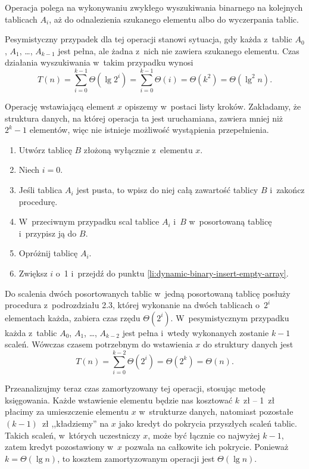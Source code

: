 
\subproblem %
Operacja  polega na wykonywaniu zwykłego wyszukiwania binarnego na kolejnych tablicach $A_i$, aż do odnalezienia szukanego elementu albo do wyczerpania tablic.

Pesymistyczny przypadek dla tej operacji stanowi sytuacja, gdy każda z~tablic $A_0$, $A_1$, \dots, $A_{k-1}$ jest pełna, ale żadna z~nich nie zawiera szukanego elementu.
Czas działania wyszukiwania w~takim przypadku wynosi
\[
	T(n) = \sum_{i=0}^{k-1}\Theta(\lg2^i) = \sum_{i=0}^{k-1}\Theta(i) = \Theta(k^2) = \Theta(\lg^2n).
\]

\subproblem %
Operację  wstawiającą element $x$ opiszemy w~postaci listy kroków.
Zakładamy, że struktura danych, na której operacja ta jest uruchamiana, zawiera mniej niż $2^k-1$ elementów, więc nie istnieje możliwość wystąpienia przepełnienia.
\begin{enumerate}
\item Utwórz tablicę $B$ złożoną wyłącznie z~elementu $x$.
\item Niech $i=0$.
\item Jeśli tablica $A_i$ jest pusta, to wpisz do niej całą zawartość tablicy $B$ i~zakończ procedurę. \label{li:dynamic-binary-insert-empty-array}
\item W~przeciwnym przypadku scal tablice $A_i$ i~$B$ w~posortowaną tablicę i~przypisz ją do $B$.
\item Opróżnij tablicę $A_i$.
\item Zwiększ $i$ o~1 i~przejdź do punktu \ref{li:dynamic-binary-insert-empty-array}.
\end{enumerate}
Do scalenia dwóch posortowanych tablic w~jedną posortowaną tablicę posłuży procedura  z~podrozdziału 2.3, której wykonanie na dwóch tablicach o~$2^i$ elementach każda, zabiera czas rzędu $\Theta(2^i)$.
W~pesymistycznym przypadku każda z~tablic $A_0$, $A_1$, \dots, $A_{k-2}$ jest pełna i~wtedy wykonanych zostanie $k-1$ scaleń.
Wówczas czasem potrzebnym do wstawienia $x$ do struktury danych jest
\[
	T(n) = \sum_{i=0}^{k-2}\Theta(2^i) = \Theta(2^k) = \Theta(n).
\]

Przeanalizujmy teraz czas zamortyzowany tej operacji, stosując metodę księgowania.
Każde wstawienie elementu będzie nas kosztować $k$~zł -- 1~zł płacimy za umieszczenie elementu $x$ w~strukturze danych, natomiast pozostałe $(k-1)$~zł ,,kładziemy'' na $x$ jako kredyt do pokrycia przyszłych scaleń tablic.
Takich scaleń, w~których uczestniczy $x$, może być łącznie co najwyżej $k-1$, zatem kredyt pozostawiony w~$x$ pozwala na całkowite ich pokrycie.
Ponieważ $k=\Theta(\lg n)$, to kosztem zamortyzowanym operacji  jest $\Theta(\lg n)$.

